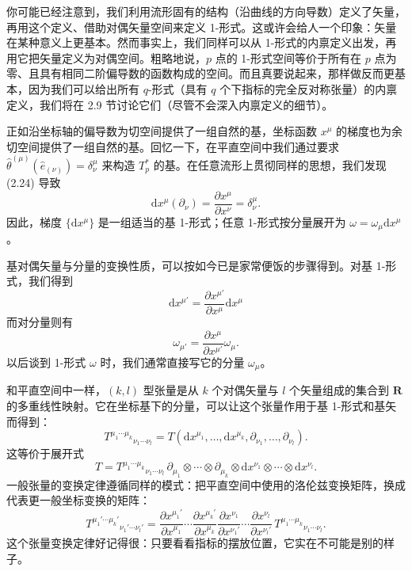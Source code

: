 你可能已经注意到，我们利用流形固有的结构（沿曲线的方向导数）定义了矢量，再用这个定义、借助对偶矢量空间来定义 1-形式。这或许会给人一个印象：矢量在某种意义上更基本。然而事实上，我们同样可以从 1-形式的内禀定义出发，再用它把矢量定义为对偶空间。粗略地说，$p$ 点的 1-形式空间等价于所有在 $p$ 点为零、且具有相同二阶偏导数的函数构成的空间。而且真要说起来，那样做反而更基本，因为我们可以给出所有 $q$-形式（具有 $q$ 个下指标的完全反对称张量）的内禀定义，我们将在 2.9 节讨论它们（尽管不会深入内禀定义的细节）。

正如沿坐标轴的偏导数为切空间提供了一组自然的基，坐标函数 $x^\mu$ 的梯度也为余切空间提供了一组自然的基。回忆一下，在平直空间中我们通过要求 $\hat{\theta}^{(\mu)}(\hat{e}_{(\nu)})=\delta^\mu_\nu$ 来构造 $T_p^*$ 的基。在任意流形上贯彻同样的思想，我们发现 (2.24) 导致
\begin{equation*}
\mathrm{d}x^\mu(\partial_\nu)=\frac{\partial x^\mu}{\partial x^\nu}=\delta^\mu_\nu. \tag{2.25}
\end{equation*}
因此，梯度 $\{\mathrm{d}x^\mu\}$ 是一组适当的基 1-形式；任意 1-形式按分量展开为 $\omega=\omega_\mu\mathrm{d}x^\mu$。

基对偶矢量与分量的变换性质，可以按如今已是家常便饭的步骤得到。对基 1-形式，我们得到
\begin{equation*}
\mathrm{d}x^{\mu'}=\frac{\partial x^{\mu'}}{\partial x^\mu}\mathrm{d}x^\mu \tag{2.26}
\end{equation*}
而对分量则有
\begin{equation*}
\omega_{\mu'}=\frac{\partial x^\mu}{\partial x^{\mu'}}\omega_\mu. \tag{2.27}
\end{equation*}
以后谈到 1-形式 $\omega$ 时，我们通常直接写它的分量 $\omega_\mu$。

和平直空间中一样，$(k,l)$ 型张量是从 $k$ 个对偶矢量与 $l$ 个矢量组成的集合到 $\mathbf{R}$ 的多重线性映射。它在坐标基下的分量，可以让这个张量作用于基 1-形式和基矢而得到：
\begin{equation*}
T^{\mu_1\cdots\mu_k}{}_{\nu_1\cdots\nu_l}=T(\mathrm{d}x^{\mu_1},\ldots,\mathrm{d}x^{\mu_k},\partial_{\nu_1},\ldots,\partial_{\nu_l}). \tag{2.28}
\end{equation*}
这等价于展开式
\begin{equation*}
T=T^{\mu_1\cdots\mu_k}{}_{\nu_1\cdots\nu_l}\,\partial_{\mu_1}\otimes\cdots\otimes\partial_{\mu_k}\otimes\mathrm{d}x^{\nu_1}\otimes\cdots\otimes\mathrm{d}x^{\nu_l}. \tag{2.29}
\end{equation*}
一般张量的变换定律遵循同样的模式：把平直空间中使用的洛伦兹变换矩阵，换成代表更一般坐标变换的矩阵：
\begin{equation*}
\boxed{T^{\mu_1'\cdots\mu_k'}{}_{\nu_1'\cdots\nu_l'}=\frac{\partial x^{\mu_1'}}{\partial x^{\mu_1}}\cdots\frac{\partial x^{\mu_k'}}{\partial x^{\mu_k}}\frac{\partial x^{\nu_1}}{\partial x^{\nu_1'}}\cdots\frac{\partial x^{\nu_l}}{\partial x^{\nu_l'}}\,T^{\mu_1\cdots\mu_k}{}_{\nu_1\cdots\nu_l}.} \tag{2.30}
\end{equation*}
这个张量变换定律好记得很：只要看看指标的摆放位置，它实在不可能是别的样子。

